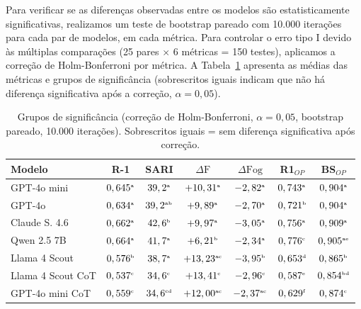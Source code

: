 \documentclass[a4paper, twocolumn, 11pt, twoside]{article}
\begin{document}
Para verificar se as diferenças observadas entre os modelos são
estatisticamente significativas, realizamos um teste de bootstrap
pareado com 10.000 iterações para cada par de modelos, em cada
métrica. Para controlar o erro tipo I devido às múltiplas
comparações (25 pares $\times$ 6 métricas = 150 testes),
aplicamos a correção de Holm-Bonferroni \citep{holm1979} por
métrica.
A Tabela~\ref{tab:significancia} apresenta as médias
das métricas e grupos de significância (sobrescritos iguais indicam
que não há diferença significativa após a correção,
$\alpha = 0,05$).

\begin{table}[htbp]
\centering
\caption{Grupos de significância (correção de Holm-Bonferroni,
         $\alpha = 0,05$, bootstrap pareado, 10.000 iterações).
         Sobrescritos iguais = sem diferença significativa após
         correção.}
\label{tab:significancia}
\footnotesize
\setlength{\tabcolsep}{3pt}
\begin{tabular}{l c c c c c c}
\toprule
Modelo & R-1 & SARI & $\Delta \mathrm{F}$ & $\Delta \mathrm{Fog}$ & R1$_{OP}$ & BS$_{OP}$ \\
\midrule
GPT-4o mini          & $0,645^{\text{\tiny a}}$   & $39,2^{\text{\tiny a}}$   & $+10,31^{\text{\tiny a}}$  & $-2,82^{\text{\tiny a}}$  & $0,743^{\text{\tiny a}}$  & $0,904^{\text{\tiny a}}$ \\
GPT-4o               & $0,634^{\text{\tiny a}}$   & $39,2^{\text{\tiny ab}}$  & $+9,89^{\text{\tiny a}}$   & $-2,70^{\text{\tiny a}}$  & $0,721^{\text{\tiny b}}$  & $0,904^{\text{\tiny a}}$ \\
Claude S. 4.6        & $0,662^{\text{\tiny a}}$   & $42,6^{\text{\tiny b}}$   & $+9,97^{\text{\tiny a}}$   & $-3,05^{\text{\tiny a}}$  & $0,756^{\text{\tiny a}}$  & $0,909^{\text{\tiny a}}$ \\
Qwen 2.5 7B          & $0,664^{\text{\tiny a}}$   & $41,7^{\text{\tiny a}}$   & $+6,21^{\text{\tiny b}}$   & $-2,34^{\text{\tiny a}}$  & $0,776^{\text{\tiny c}}$  & $0,905^{\text{\tiny ae}}$ \\
Llama 4 Scout        & $0,576^{\text{\tiny b}}$   & $38,7^{\text{\tiny a}}$   & $+13,23^{\text{\tiny ac}}$ & $-3,95^{\text{\tiny b}}$  & $0,653^{\text{\tiny d}}$  & $0,865^{\text{\tiny b}}$ \\
Llama 4 Scout CoT    & $0,537^{\text{\tiny c}}$   & $34,6^{\text{\tiny c}}$   & $+13,41^{\text{\tiny c}}$  & $-2,96^{\text{\tiny c}}$  & $0,587^{\text{\tiny e}}$  & $0,854^{\text{\tiny bd}}$ \\
GPT-4o mini CoT      & $0,559^{\text{\tiny c}}$   & $34,6^{\text{\tiny cd}}$  & $+12,00^{\text{\tiny ac}}$ & $-2,37^{\text{\tiny ac}}$ & $0,629^{\text{\tiny f}}$  & $0,874^{\text{\tiny c}}$ \\

\end{tabular}
\end{table}
\end{document}
